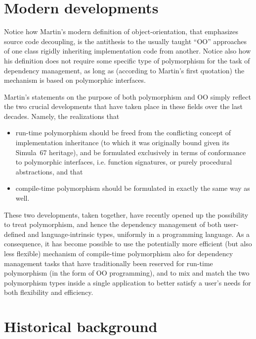\documentclass[11pt,oneside]{report}
\begin{document}
\section{Modern developments}

Notice how Martin's modern definition of object-orientation, that
emphasizes source code decoupling, is the antithesis to the usually
taught ``OO'' approaches of one class rigidly inheriting
implementation code from another. Notice also how his definition does
not require some specific type of polymorphism for the task of
dependency management, as long as (according to Martin's first
quotation) the mechanism is based on polymorphic interfaces.

Martin's statements on the purpose of both polymorphism and OO simply
reflect the two crucial developments that have taken place in these
fields over the last decades. Namely, the realizations that
\begin{itemize}
\item
  run-time polymorphism should be freed from the conflicting concept
  of implementation inheritance (to which it was originally bound
  given its Simula~67 heritage), and be formulated exclusively in
  terms of conformance to polymorphic interfaces, i.e. function
  signatures, or purely procedural abstractions, and that
\item
  compile-time polymorphism should be formulated in exactly the same
  way as well.
\end{itemize}

These two developments, taken together, have recently opened up the
possibility to treat polymorphism, and hence the dependency management
of both user-defined and language-intrinsic types, uniformly in a
programming language. As a consequence, it has become possible to use
the potentially more efficient (but also less flexible) mechanism of
compile-time polymorphism also for dependency management tasks that have
traditionally been reserved for run-time polymorphism (in the form of
OO programming), and to mix and match the two polymorphism types
inside a single application to better satisfy a user's needs for both
flexibility and efficiency.

\section{Historical background}
\end{document}
